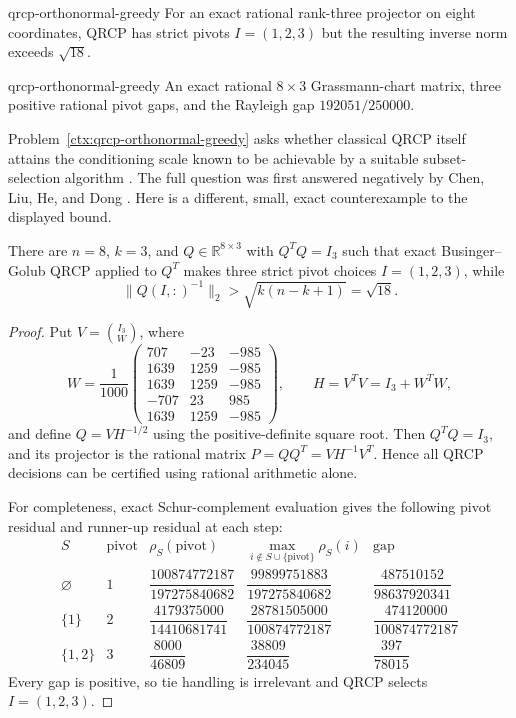 \begin{cxsummary}{qrcp-orthonormal-greedy}
For an exact rational rank-three projector on eight coordinates, QRCP has
strict pivots $I=(1,2,3)$ but the resulting inverse norm exceeds $\sqrt{18}$.
\end{cxsummary}

\begin{cxcertificate}{qrcp-orthonormal-greedy}
An exact rational $8\times3$ Grassmann-chart matrix, three positive rational
pivot gaps, and the Rayleigh gap $192051/250000$.
\end{cxcertificate}

\begin{cxrefutation}
Problem~\ref{ctx:qrcp-orthonormal-greedy} asks whether classical QRCP itself
attains the conditioning scale known to be achievable by a suitable
subset-selection algorithm \cite{AmselEtAl2026}.  The full question was first answered negatively by
Chen, Liu, He, and Dong \cite{ChenLiuHeDong2026}.  Here is a different,
small, exact counterexample to the displayed bound.

\begin{theorem}
\label{thm:qrcp-orthonormal-greedy}
There are $n=8$, $k=3$, and $Q\in\mathbb R^{8\times3}$ with $Q^TQ=I_3$
such that exact Businger--Golub QRCP applied to $Q^T$ makes three strict
pivot choices $I=(1,2,3)$, while
\[
 \|Q(I,:)^{-1}\|_2>\sqrt{k(n-k+1)}=\sqrt{18}.
\]
\end{theorem}
\begin{proof}
Put $V=\binom{I_3}{W}$, where
\[
 W=\frac1{1000}\begin{pmatrix}
 707&-23&-985\\
 1639&1259&-985\\
 1639&1259&-985\\
 -707&23&985\\
 1639&1259&-985
 \end{pmatrix},
 \qquad H=V^TV=I_3+W^TW,
\]
and define $Q=VH^{-1/2}$ using the positive-definite square root.  Then
$Q^TQ=I_3$, and its projector is the rational matrix
$P=QQ^T=VH^{-1}V^T$.  Hence all QRCP decisions can be certified using
rational arithmetic alone.

For completeness, exact Schur-complement evaluation gives the following
pivot residual and runner-up residual at each step:
\[
\begin{array}{c|c|c|c|c}
 S & \text{pivot} & \rho_S(\text{pivot}) &
 \max_{i\notin S\cup\{\text{pivot}\}}\rho_S(i)&\text{gap}\\ \hline
 \varnothing&1&\dfrac{100874772187}{197275840682}&
 \dfrac{99899751883}{197275840682}&
 \dfrac{487510152}{98637920341}\\[5pt]
 \{1\}&2&\dfrac{4179375000}{14410681741}&
 \dfrac{28781505000}{100874772187}&
 \dfrac{474120000}{100874772187}\\[5pt]
 \{1,2\}&3&\dfrac{8000}{46809}&
 \dfrac{38809}{234045}&
 \dfrac{397}{78015}
\end{array}
\]
Every gap is positive, so tie handling is irrelevant and QRCP selects
$I=(1,2,3)$.


\end{proof}
\end{cxrefutation}
